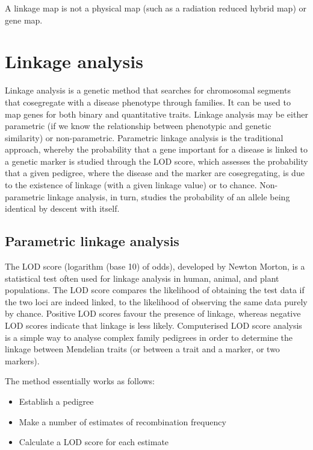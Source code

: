 A linkage map is not a physical map (such as a radiation reduced hybrid map) or gene map.

\hypertarget{linkage-analysis}{%
\section{Linkage analysis}\label{linkage-analysis}}

Linkage analysis is a genetic method that searches for chromosomal segments that cosegregate with a disease phenotype through families. It can be used to map genes for both binary and quantitative traits. Linkage analysis may be either parametric (if we know the relationship between phenotypic and genetic similarity) or non-parametric. Parametric linkage analysis is the traditional approach, whereby the probability that a gene important for a disease is linked to a genetic marker is studied through the LOD score, which assesses the probability that a given pedigree, where the disease and the marker are cosegregating, is due to the existence of linkage (with a given linkage value) or to chance. Non-parametric linkage analysis, in turn, studies the probability of an allele being identical by descent with itself.

\hypertarget{parametric-linkage-analysis}{%
\subsection{Parametric linkage analysis}\label{parametric-linkage-analysis}}

The LOD score (logarithm (base 10) of odds), developed by Newton Morton, is a statistical test often used for linkage analysis in human, animal, and plant populations. The LOD score compares the likelihood of obtaining the test data if the two loci are indeed linked, to the likelihood of observing the same data purely by chance. Positive LOD scores favour the presence of linkage, whereas negative LOD scores indicate that linkage is less likely. Computerised LOD score analysis is a simple way to analyse complex family pedigrees in order to determine the linkage between Mendelian traits (or between a trait and a marker, or two markers).

The method essentially works as follows:

\begin{itemize}
\tightlist
\item
  Establish a pedigree
\item
  Make a number of estimates of recombination frequency
\item
  Calculate a LOD score for each estimate
\end{itemize}


